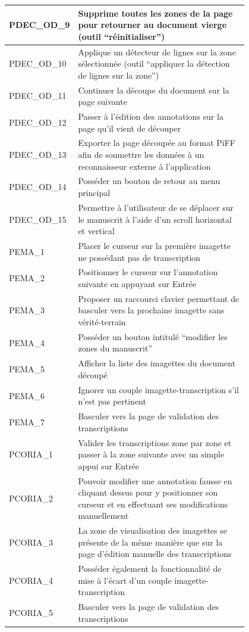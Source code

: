 \begin{center}
\begin{tabular}{ | l | p{0.8\linewidth} | }
	\hline
	PDEC\_OD\_9 & Supprime toutes les zones de la page pour retourner au document vierge (outil “réinitialiser”) \\
	\hline
	PDEC\_OD\_10 & Applique un détecteur de lignes sur la zone sélectionnée (outil “appliquer la détection de lignes sur la zone”) \\
	\hline
	PDEC\_OD\_11 & Continuer la découpe du document sur la page suivante \\
	\hline
	PDEC\_OD\_12 & Passer à l’édition des annotations sur la page qu’il vient de découper \\
	\hline
	PDEC\_OD\_13 & Exporter la page découpée au format PiFF afin de soumettre les données à un reconnaisseur externe à l’application \\
	\hline
	PDEC\_OD\_14 & Posséder un bouton de retour au menu principal \\
	\hline
	PDEC\_OD\_15 & Permettre à l’utilisateur de se déplacer sur le manuscrit à l’aide d’un scroll horizontal et vertical \\
	\hline
	PEMA\_1 & Placer le curseur sur la première imagette ne possédant pas de transcription \\
	\hline
	PEMA\_2 & Positionner le curseur sur l’annotation suivante en appuyant sur Entrée \\
	\hline
	PEMA\_3 & Proposer un raccourci clavier permettant de basculer vers la prochaine imagette sans vérité-terrain \\
	\hline
	PEMA\_4 & Posséder un bouton intitulé “modifier les zones du manuscrit” \\
	\hline
	PEMA\_5 & Afficher la liste des imagettes du document découpé \\
	\hline
	PEMA\_6 & Ignorer un couple imagette-transcription s’il n’est pas pertinent \\
	\hline
	PEMA\_7 & Basculer vers la page de validation des transcriptions \\
	\hline
	PCORIA\_1 & Valider les transcriptions zone par zone et passer à la zone suivante avec un simple appui sur Entrée \\
	\hline
	PCORIA\_2 & Pouvoir modifier une annotation fausse en cliquant dessus pour y positionner son curseur et en effectuant ses modifications manuellement \\
	\hline
	PCORIA\_3 & La zone de visualisation des imagettes se présente de la même manière que sur la page d’édition manuelle des transcriptions \\
	\hline
	PCORIA\_4 & Posséder également la fonctionnalité de mise à l’écart d’un couple imagette-transcription \\
	\hline
	PCORIA\_5 & Basculer vers la page de validation des transcriptions \\
	\hline
\end{tabular}


\end{center}
